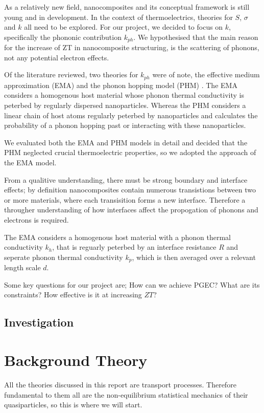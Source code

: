 \documentclass[12pt,draft]{article}
\begin{document}
As a relatively new field, nanocomposites and its conceptual framework is still young and in development. In the context of thermoelectrics, theories for $S$, $\sigma$ and $k$ all need to be explored. For our project, we decided to focus on $k$, specifically the phononic contribution $k_{ph}$. We hypothesised that the main reason for the increase of ZT in nanocomposite structuring, is the scattering of phonons, not any potential electron effects.

Of the literature reviewed, two theories for $k_{ph}$ were of note, the effective medium approximation (EMA) \cite{ema} and the phonon hopping model (PHM) \cite{phm}. The EMA considers a homogenous host material whose phonon thermal conductivity is peterbed by regularly dispersed nanoparticles. Whereas the PHM considers a linear chain of host atoms regularly peterbed by nanoparticles and calculates the probability of a phonon hopping past or interacting with these nanoparticles. 

We evaluated both the EMA and PHM models in detail and decided that the PHM neglected crucial thermoelectric properties, so we adopted the approach of the EMA model.



From a qualitive understanding, there must be strong boundary and interface effects; by definition nanocomposites contain numerous transistions between two or more materials, where each transisition forms a new interface. Therefore a througher understanding of how interfaces affect the propogation of phonons and electrons is required.

The EMA considers a homogenous host material with a phonon thermal conductivity $k_h$, that is reguarly peterbed by an interface resistance $R$ and seperate phonon thermal conductivity $k_p$, which is then averaged over a relevant length scale $d$.

Some key questions for our project are; How can we achieve \ac{PGEC}? What are its constraints? How effective is it at increasing $ZT$?


\subsection{Investigation}

\section{Background Theory}
All the theories discussed in this report are transport processes. Therefore fundamental to them all are the non-equilibrium statistical mechanics of their quasiparticles, so this is where we will start.
\end{document}
